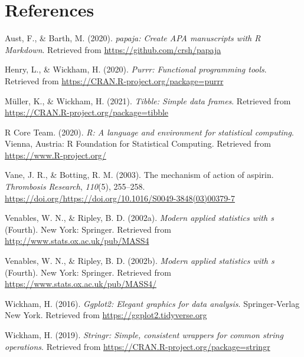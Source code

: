 \documentclass[
  english,
  man]{apa6}
\newlength{\cslhangindent}
\newenvironment{cslreferences}%
  {\setlength{\parindent}{0pt}%
  \everypar{\setlength{\hangindent}{\cslhangindent}}\ignorespaces}%
  {\par}
\begin{document}
\hypertarget{references}{%
\section{References}\label{references}}

\begingroup
\setlength{\parindent}{-0.5in}
\setlength{\leftskip}{0.5in}

\hypertarget{refs}{}
\begin{cslreferences}
\leavevmode\hypertarget{ref-R-papaja}{}%
Aust, F., \& Barth, M. (2020). \emph{papaja: Create APA manuscripts with R Markdown}. Retrieved from \url{https://github.com/crsh/papaja}

\leavevmode\hypertarget{ref-R-purrr}{}%
Henry, L., \& Wickham, H. (2020). \emph{Purrr: Functional programming tools}. Retrieved from \url{https://CRAN.R-project.org/package=purrr}

\leavevmode\hypertarget{ref-R-tibble}{}%
Müller, K., \& Wickham, H. (2021). \emph{Tibble: Simple data frames}. Retrieved from \url{https://CRAN.R-project.org/package=tibble}

\leavevmode\hypertarget{ref-R-base}{}%
R Core Team. (2020). \emph{R: A language and environment for statistical computing}. Vienna, Austria: R Foundation for Statistical Computing. Retrieved from \url{https://www.R-project.org/}

\leavevmode\hypertarget{ref-VANE2003255}{}%
Vane, J. R., \& Botting, R. M. (2003). The mechanism of action of aspirin. \emph{Thrombosis Research}, \emph{110}(5), 255--258. \url{https://doi.org/https://doi.org/10.1016/S0049-3848(03)00379-7}

\leavevmode\hypertarget{ref-R-MASS}{}%
Venables, W. N., \& Ripley, B. D. (2002a). \emph{Modern applied statistics with s} (Fourth). New York: Springer. Retrieved from \url{http://www.stats.ox.ac.uk/pub/MASS4}

\leavevmode\hypertarget{ref-R-nnet}{}%
Venables, W. N., \& Ripley, B. D. (2002b). \emph{Modern applied statistics with s} (Fourth). New York: Springer. Retrieved from \url{https://www.stats.ox.ac.uk/pub/MASS4/}

\leavevmode\hypertarget{ref-R-ggplot2}{}%
Wickham, H. (2016). \emph{Ggplot2: Elegant graphics for data analysis}. Springer-Verlag New York. Retrieved from \url{https://ggplot2.tidyverse.org}

\leavevmode\hypertarget{ref-R-stringr}{}%
Wickham, H. (2019). \emph{Stringr: Simple, consistent wrappers for common string operations}. Retrieved from \url{https://CRAN.R-project.org/package=stringr}


\end{cslreferences}
\end{document}
